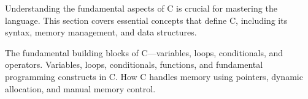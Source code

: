 \begin{comment}
2.4.2.2 Boolean Type (<stdbool.h>)

2.4.2.3 Additional Floating-Point Handling (<fenv.h>)

2.5 C11 – Concurrency and Performance (2011 - 2018)
2.5.1 Threading and Atomics (<threads.h>)

2.5.1.1 Introduction of Portable Threading APIs

2.5.1.2 Atomic Operations for Data Synchronization

2.5.2 Library Evolution

2.5.2.1 Unicode and Multibyte Character Support

2.5.2.2 Safer Memory Functions (strncpy, memset_s)

2.6 C17 and Beyond – Refinements (2018 - Present)
2.6.1 Cleanup and Minor Adjustments

2.6.1.1 Deprecated Features Removal

2.6.1.2 Improved Compiler Support
\end{comment}

\begin{NxSBox}[][Fundamentals of C]
	\begin{NxIDBox}
		Understanding the fundamental aspects of C is crucial for mastering the language. This section covers essential concepts that define C, including its syntax, memory management, and data structures.
	\end{NxIDBox}
	\begin{NxIDBoxL}
		 The fundamental building blocks of C—variables, loops, conditionals, and operators.
		 Variables, loops, conditionals, functions, and fundamental programming constructs in C.
		 How C handles memory using pointers, dynamic allocation, and manual memory control.
	\end{NxIDBoxL}
\end{NxSBox}

